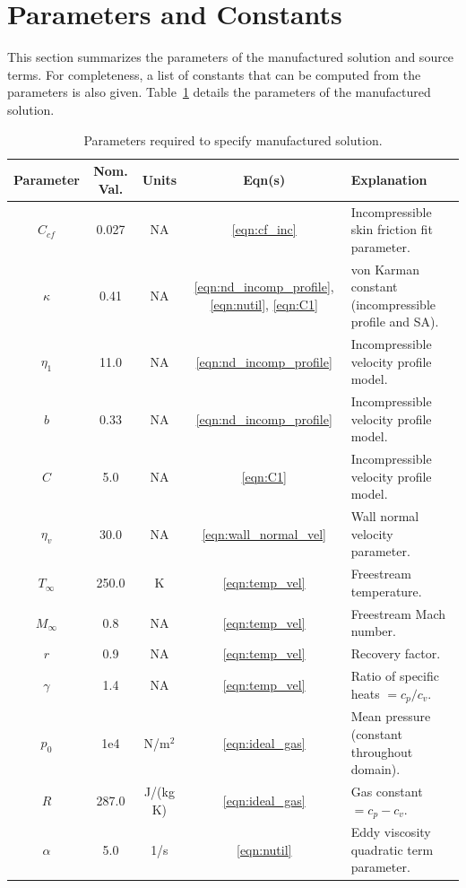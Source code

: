 \section{Parameters and Constants}
This section summarizes the parameters of the manufactured solution
and source terms.  For completeness, a list of constants that can be
computed from the parameters is also given.
%
Table~\ref{tbl:soln_parameters} details the parameters of the manufactured solution.
%
\begin{table}[ht]
\caption{Parameters required to specify manufactured solution.}
\begin{center}
\begin{tabular}{|c|c|c|c|l|}
\hline
Parameter & Nom. Val. & Units & Eqn(s) & Explanation \\
\hline
$C_{cf}$ & 0.027 & NA & \ref{eqn:cf_inc} & Incompressible skin friction fit parameter. \\
$\kappa$ & 0.41 & NA & \ref{eqn:nd_incomp_profile}, \ref{eqn:nutil}, \ref{eqn:C1} & von Karman constant (incompressible profile and SA). \\
$\eta_1$ & 11.0 & NA & \ref{eqn:nd_incomp_profile} & Incompressible velocity profile model. \\
$b$ & 0.33 & NA & \ref{eqn:nd_incomp_profile} & Incompressible velocity profile model. \\
$C$ & 5.0 & NA & \ref{eqn:C1} & Incompressible velocity profile model. \\
$\eta_v$ & 30.0 & NA & \ref{eqn:wall_normal_vel} & Wall normal velocity parameter. \\
$T_{\infty}$ & 250.0 & K & \ref{eqn:temp_vel} & Freestream temperature. \\
$M_{\infty}$ & 0.8 & NA & \ref{eqn:temp_vel} & Freestream Mach number. \\
$r$ & 0.9 & NA & \ref{eqn:temp_vel} & Recovery factor. \\
$\gamma$ & 1.4 & NA & \ref{eqn:temp_vel} & Ratio of specific heats $ = c_p/c_v$. \\
$p_0$ & 1e4 & N/m$^2$ & \ref{eqn:ideal_gas} & Mean pressure (constant throughout domain). \\
$R$ & 287.0 & J/(kg K) & \ref{eqn:ideal_gas} & Gas constant $ = c_p - c_v$. \\
$\alpha$ & 5.0 & 1/s & \ref{eqn:nutil} & Eddy viscosity quadratic term parameter. \\
\hline
\end{tabular}
\end{center}
\label{tbl:soln_parameters}
\end{table}
